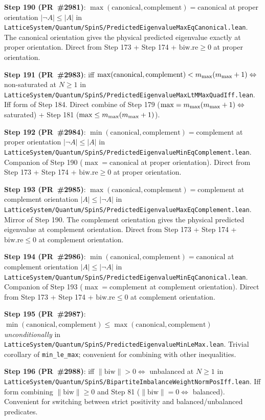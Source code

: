 \documentclass[a4paper,11pt]{article}
\begin{document}
\textbf{Step 190 (PR~\#2981)}: $\max(\mathrm{canonical}, \mathrm{complement})
= \mathrm{canonical}$ at proper orientation $|\neg A| \le |A|$ in
\texttt{LatticeSystem/Quantum/SpinS/PredictedEigenvalueMaxEqCanonical.lean}.
The canonical orientation gives the physical predicted eigenvalue
exactly at proper orientation. Direct from Step 173 + Step 174 +
$\mathrm{biw.re} \ge 0$ at proper orientation.

\textbf{Step 191 (PR~\#2983)}: iff
$\max(\mathrm{canonical}, \mathrm{complement}) < m_{\rm max}(m_{\rm max}+1)
\Leftrightarrow$ non-saturated at $N \ge 1$ in
\texttt{LatticeSystem/Quantum/SpinS/PredictedEigenvalueMaxLtMMaxQuadIff.lean}.
Iff form of Step 184. Direct combine of Step 179
($\max = m_{\rm max}(m_{\rm max}+1) \Leftrightarrow$ saturated) +
Step 181 ($\max \le m_{\rm max}(m_{\rm max}+1)$).

\textbf{Step 192 (PR~\#2984)}: $\min(\mathrm{canonical}, \mathrm{complement})
= \mathrm{complement}$ at proper orientation $|\neg A| \le |A|$ in
\texttt{LatticeSystem/Quantum/SpinS/PredictedEigenvalueMinEqComplement.lean}.
Companion of Step 190 ($\max = \mathrm{canonical}$ at proper
orientation). Direct from Step 173 + Step 174 + $\mathrm{biw.re} \ge 0$
at proper orientation.

\textbf{Step 193 (PR~\#2985)}: $\max(\mathrm{canonical}, \mathrm{complement})
= \mathrm{complement}$ at complement orientation $|A| \le |\neg A|$ in
\texttt{LatticeSystem/Quantum/SpinS/PredictedEigenvalueMaxEqComplement.lean}.
Mirror of Step 190. The complement orientation gives the physical
predicted eigenvalue at complement orientation. Direct from Step 173 +
Step 174 + $\mathrm{biw.re} \le 0$ at complement orientation.

\textbf{Step 194 (PR~\#2986)}: $\min(\mathrm{canonical}, \mathrm{complement})
= \mathrm{canonical}$ at complement orientation $|A| \le |\neg A|$ in
\texttt{LatticeSystem/Quantum/SpinS/PredictedEigenvalueMinEqCanonical.lean}.
Companion of Step 193 ($\max = \mathrm{complement}$ at complement
orientation). Direct from Step 173 + Step 174 + $\mathrm{biw.re} \le 0$
at complement orientation.

\textbf{Step 195 (PR~\#2987)}:
$\min(\mathrm{canonical}, \mathrm{complement}) \le
\max(\mathrm{canonical}, \mathrm{complement})$ \emph{unconditionally}
in
\texttt{LatticeSystem/Quantum/SpinS/PredictedEigenvalueMinLeMax.lean}.
Trivial corollary of \texttt{min\_le\_max}; convenient for combining
with other inequalities.

\textbf{Step 196 (PR~\#2988)}: iff $\|\mathrm{biw}\| > 0 \Leftrightarrow$
unbalanced at $N \ge 1$ in
\texttt{LatticeSystem/Quantum/SpinS/BipartiteImbalanceWeightNormPosIff.lean}.
Iff form combining $\|\mathrm{biw}\| \ge 0$ and Step 81 ($\|\mathrm{biw}\|
= 0 \Leftrightarrow$ balanced). Convenient for switching between strict
positivity and balanced/unbalanced predicates.
\end{document}
